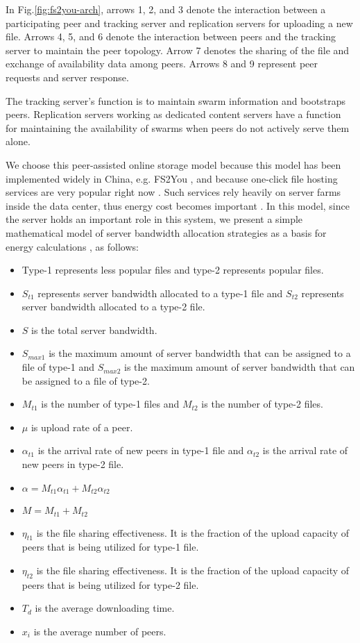 In Fig.\ref{fig:fs2you-arch}, arrows 1, 2, and 3 denote the interaction between a participating peer and tracking server and replication servers for uploading a new file. 
Arrows 4, 5, and 6 denote the interaction between peers and the tracking server to maintain the peer topology. 
Arrow 7 denotes the sharing of the file and exchange of availability data among peers. 
Arrows 8 and 9 represent peer requests and server response.

The tracking server’s function is to maintain swarm information and bootstraps peers. 
Replication servers working as dedicated content servers have a function for maintaining the availability of swarms when peers do not actively serve them alone. 

We choose this peer-assisted online storage model because this model has been implemented widely in China, e.g. FS2You \cite{fs2you}, and because one-click file hosting services are very popular right now \cite{Mahanti:2011:MAC:1963192.1963346}. 
Such services rely heavily on server farms inside the data center, thus energy cost becomes important \cite{arstechnica}. 
In this model, since the server holds an important role in this system, we present a simple mathematical model of server bandwidth allocation strategies as a basis for energy calculations \cite{4199285,Sun:2009:POS:1542245.1542249}, as follows: 

\begin{itemize}
\item Type-1 represents less popular files and type-2 represents popular files. 
\item $S_{t1}$ represents server bandwidth allocated to a type-1 file and $S_{t2}$ represents server bandwidth allocated to a type-2 file. 
\item $S$ is the total server bandwidth.
\item $S_{max1}$ is the maximum amount of server bandwidth that can be assigned to a file of type-1 and $S_{max2}$ is the maximum amount of server bandwidth that can be assigned to a file of type-2.
\item $M_{t1}$ is the number of type-1 files and $M_{t2}$ is the number of type-2 files.
\item $\mu$ is upload rate of a peer.
\item $\alpha_{t1}$ is the arrival rate of new peers in type-1 file and $\alpha_{t2}$ is the arrival rate of new peers in type-2 file.
\item $\alpha = M_{t1} \alpha_{t1} + M_{t2} \alpha_{t2}$
\item $M=M_{t1} + M_{t2}$ 
\item $\eta_{t1}$  is the file sharing effectiveness. It is the fraction of the upload capacity of peers that is being utilized for type-1 file.
\item $\eta_{t2}$  is the file sharing effectiveness. It is the fraction of the upload capacity of peers that is being utilized for type-2 file.
\item $T_d$ is the average downloading time. 
\item $x_i$ is the average number of peers.
\end{itemize}

